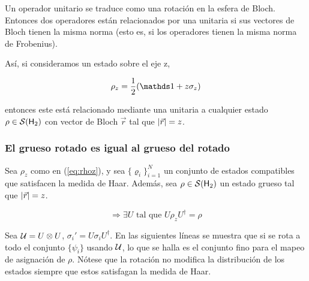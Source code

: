Un operador unitario se traduce como una rotación en la esfera de Bloch. Entonces dos operadores están relacionados por una unitaria si sus vectores de Bloch tienen la misma norma (esto es, si los operadores tienen la misma norma de Frobenius).

Así, si consideramos un estado sobre el eje z,

\begin{equation}\label{eq:rhoz}
\rho_{z}=\frac{1}{2}\qty(\Id+z\sigma_{z})
\end{equation}

entonces este está relacionado mediante una unitaria a cualquier estado $\rho\in\mathcal{S}({\sf H}_2)$ con vector de Bloch $\vec{r}$ tal que $\abs{\vec{r}}=z$.

\subsubsection{El grueso rotado es igual al grueso del rotado}
Sea $\rho_{z}$ como en (\ref{eq:rhoz}), y sea $\{\varrho_{i}\}_{i=1}^{N}$ un conjunto de estados compatibles que satisfacen la medida de Haar. Además, sea $\rho\in\mathcal{S}( {\sf H}_2)$ un estado grueso tal que $\abs{\vec{r}}=z$.

\begin{equation}
\Rightarrow \exists U \text{ tal que } U\rho_{z}U^{\dag}=\rho
\end{equation}

Sea $\mathcal{U}=U\otimes U$, $\sigma_{i}'=U\sigma_{i}U^{\dag}$. En las siguientes líneas se muestra que si se rota a todo el conjunto $\{\psi_{i}\}$ usando $\mathcal{U}$, lo que se halla es el conjunto fino para el mapeo de asignación de $\rho$. Nótese que la rotación no modifica la distribución de los estados siempre que estos satisfagan la medida de Haar.

